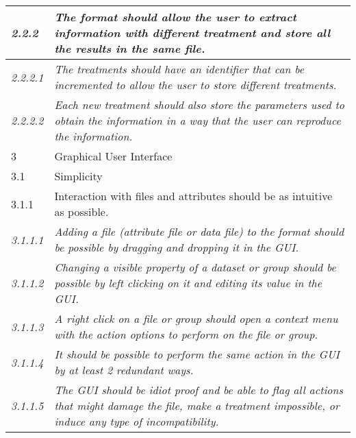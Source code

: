 \begin{tabular}{|p{1cm}|p{14cm}|}
    \rowcolor{graysuperlight}\textit{2.2.2} & \textit{The format should allow the user to extract information with different treatment and store all the results in the same file.} \\ \hline
    \textit{2.2.2.1} & \textit{The treatments should have an identifier that can be incremented to allow the user to store different treatments.} \\ \hline
    \textit{2.2.2.2} & \textit{Each new treatment should also store the parameters used to obtain the information in a way that the user can reproduce the information.} \\ \hline

    \rowcolor{grayheavy} 3 & Graphical User Interface \\ \hline

    \rowcolor{graylight} 3.1 &  Simplicity \\ \hline
    \rowcolor{graysuperlight} 3.1.1 &  Interaction with files and attributes should be as intuitive as possible. \\ \hline
    \textit{3.1.1.1} &  \textit{Adding a file (attribute file or data file) to the format should be possible by dragging and dropping it in the GUI.} \\ \hline
    \textit{3.1.1.2} &  \textit{Changing a visible property of a dataset or group should be possible by left clicking on it and editing its value in the GUI.} \\ \hline
    \textit{3.1.1.3} &  \textit{A right click on a file or group should open a context menu with the action options to perform on the file or group.} \\ \hline
    \textit{3.1.1.4} &  \textit{It should be possible to perform the same action in the GUI by at least 2 redundant ways.}\\ \hline
    \textit{3.1.1.5} &  \textit{The GUI should be idiot proof and be able to flag all actions that might damage the file, make a treatment impossible, or induce any type of incompatibility.}\\ \hline
    


\end{tabular}

